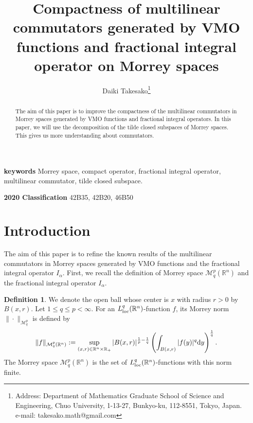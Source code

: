 \documentclass[11pt,a4]{article}
\numberwithin{equation}{section}
\theoremstyle{definition}
\newtheorem{definition}[theorem]{Definition}
\theoremstyle{remark}
\begin{document}
\title{Compactness of multilinear commutators generated by VMO functions and fractional integral operator on Morrey spaces}

\author{Daiki Takesako\footnote{Address: Department of Mathematics Graduate School of Science and Engineering, Chuo University, 1-13-27, Bunkyo-ku, 112-8551, Tokyo, Japan. e-mail: takesako.math@gmail.com}}




\date{}

\maketitle


\begin{abstract}
The aim of this paper is to improve the compactness of the multilinear commutators in Morrey spaces generated by VMO functions and fractional integral operators. In this paper, we will use the decomposition of the tilde closed subspaces of Morrey spaces. This gives us more understanding about commutators.
\end{abstract}

{\bf keywords} Morrey space, compact operator, fractional integral operator, multilinear commutator, tilde closed subspace.

{\bf 2020 Classification} 42B35, 42B20, 46B50





\section{Introduction}
The aim of this paper is to refine the known results of the multilinear commutators in Morrey spaces generated by VMO functions and the fractional integral operator $I_{\alpha}$. First, we recall the definition of Morrey space ${\mathcal M}^{p}_q({\mathbb R}^n)$ and the fractional integral operator $I_{\alpha}$.
\begin{definition}
	We denote the open ball whose center is $x$ with radius $r>0$ by $B(x,r)$. Let $1\le q \le p < \infty$. For an $L^{q}_{\rm loc}({\mathbb R}^n)$-function $f$, its Morrey norm $\| \cdot \|_{{\mathcal M}^{p}_q}$ is defined by
	\begin{equation*}
		\| f \|_{{\mathcal M}^{p}_q({\mathbb R}^n)}
		:=
		\sup\limits_{(x,r) \in {\mathbb R}^{n} \times \mathbb{R}_+}
		|B(x,r)|^{\frac{1}{p}-\frac{1}{q}}
		\left(
		\int_{B(x,r)}|f(y)|^{q}{\rm d}y
		\right)^{\frac{1}{q}}.
	\end{equation*}
	The Morrey space ${\mathcal M}^{p}_q({\mathbb R}^n)$ is the set of $L^{q}_{\rm loc}({\mathbb R}^n)$-functions with this norm finite.
\end{definition}
\end{document}
